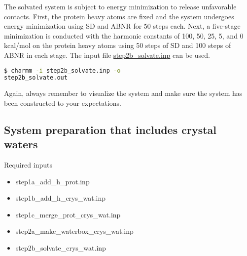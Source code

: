 The solvated system is subject to energy minimization to release unfavorable contacts. 
First, the protein heavy atoms are fixed and the system undergoes energy minimization using SD and ABNR for 50 steps each. 
Next, a five-stage minimization is conducted with the harmonic constants
of 100, 50, 25, 5, and 0 kcal/mol on the protein heavy atoms using 50 steps of SD and 100 steps of ABNR in each stage. 
The input file
\href{https://gitlab.com/shenlab-amber-cphmd/cphmd-tutorial/-/tree/main/hphmd_charmm/bbl_sys_prep}
{step2b\_solvate.inp} can be used.
%
\begin{lstlisting}[language=bash]
$ charmm -i step2b_solvate.inp -o
step2b_solvate.out
\end{lstlisting}
%
Again, always remember to visualize the system and make sure the system has been constructed to your expectations. 

\subsection{System preparation that includes crystal waters}

\begin{checklist}{Required inputs}
\begin{itemize}
\item step1a\_add\_h\_prot.inp
\item step1b\_add\_h\_crys\_wat.inp
\item step1c\_merge\_prot\_crys\_wat.inp
\item step2a\_make\_waterbox\_crys\_wat.inp
\item step2b\_solvate\_crys\_wat.inp 
\end{itemize}
\end{checklist}

